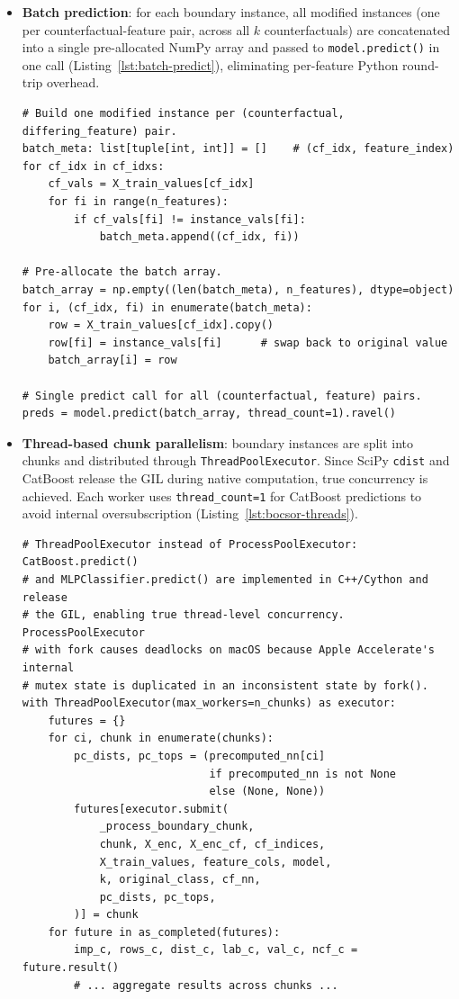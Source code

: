\begin{itemize}
  \item \textbf{Batch prediction}: for each boundary instance, all modified instances (one per counterfactual-feature pair, across all $k$ counterfactuals) are concatenated into a single pre-allocated NumPy array and passed to \texttt{model.predict()} in one call (Listing~\ref{lst:batch-predict}), eliminating per-feature Python round-trip overhead.

\begin{lstlisting}[style=pipeline,caption={Batched relevance check --- Algorithm~2 of BoCSoR (\texttt{src/feature\_importance.py}).},label={lst:batch-predict}]
# Build one modified instance per (counterfactual, differing_feature) pair.
batch_meta: list[tuple[int, int]] = []    # (cf_idx, feature_index)
for cf_idx in cf_idxs:
    cf_vals = X_train_values[cf_idx]
    for fi in range(n_features):
        if cf_vals[fi] != instance_vals[fi]:
            batch_meta.append((cf_idx, fi))

# Pre-allocate the batch array.
batch_array = np.empty((len(batch_meta), n_features), dtype=object)
for i, (cf_idx, fi) in enumerate(batch_meta):
    row = X_train_values[cf_idx].copy()
    row[fi] = instance_vals[fi]      # swap back to original value
    batch_array[i] = row

# Single predict call for all (counterfactual, feature) pairs.
preds = model.predict(batch_array, thread_count=1).ravel()
\end{lstlisting}

  \item \textbf{Thread-based chunk parallelism}: boundary instances are split into chunks and distributed through \texttt{ThreadPoolExecutor}.
  Since SciPy \texttt{cdist} and CatBoost release the GIL during native computation, true concurrency is achieved.
  Each worker uses \texttt{thread\_count=1} for CatBoost predictions to avoid internal oversubscription (Listing~\ref{lst:bocsor-threads}).

\begin{lstlisting}[style=pipeline,caption={Thread-based chunk parallelism for BoCSoR (\texttt{src/feature\_importance.py}).},label={lst:bocsor-threads}]
# ThreadPoolExecutor instead of ProcessPoolExecutor: CatBoost.predict()
# and MLPClassifier.predict() are implemented in C++/Cython and release
# the GIL, enabling true thread-level concurrency.  ProcessPoolExecutor
# with fork causes deadlocks on macOS because Apple Accelerate's internal
# mutex state is duplicated in an inconsistent state by fork().
with ThreadPoolExecutor(max_workers=n_chunks) as executor:
    futures = {}
    for ci, chunk in enumerate(chunks):
        pc_dists, pc_tops = (precomputed_nn[ci]
                             if precomputed_nn is not None
                             else (None, None))
        futures[executor.submit(
            _process_boundary_chunk,
            chunk, X_enc, X_enc_cf, cf_indices,
            X_train_values, feature_cols, model,
            k, original_class, cf_nn,
            pc_dists, pc_tops,
        )] = chunk
    for future in as_completed(futures):
        imp_c, rows_c, dist_c, lab_c, val_c, ncf_c = future.result()
        # ... aggregate results across chunks ...
\end{lstlisting}


\end{itemize}
